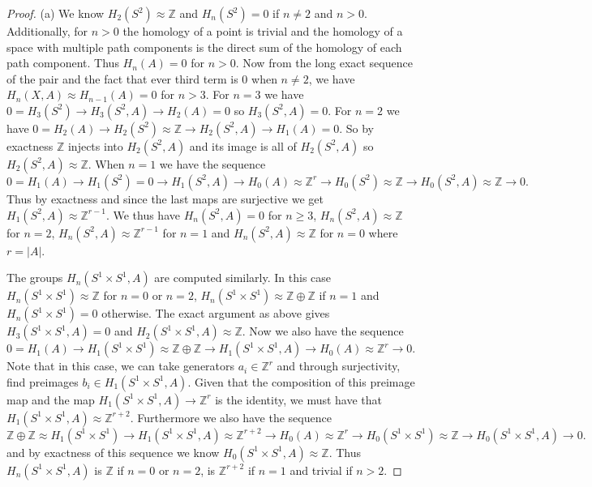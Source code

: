 \documentclass{article}
\begin{document}
\begin{proof}
(a) We know $H_2(S^2) \approx \mathbb{Z}$ and $H_n(S^2) = 0$ if $n \neq 2$ and $n > 0$. Additionally, for $n > 0$ the homology of a point is trivial and the homology of a space with multiple path components is the direct sum of the homology of each path component. Thus $H_n(A) = 0$ for $n > 0$. Now from the long exact sequence of the pair and the fact that ever third term is $0$ when $n \neq 2$, we have $H_n(X,A) \approx H_{n-1}(A) = 0$ for $n > 3$. For $n = 3$ we have $0 = H_3(S^2) \to H_3(S^2,A) \to H_2(A) = 0$ so $H_3(S^2,A) = 0$. For $n = 2$ we have $0 = H_2(A) \to H_2(S^2) \approx \mathbb{Z} \to H_2(S^2,A) \to H_1(A) = 0$. So by exactness $\mathbb{Z}$ injects into $H_2(S^2,A)$ and its image is all of $H_2(S^2,A)$ so $H_2(S^2,A) \approx \mathbb{Z}$. When $n = 1$ we have the sequence
\[
0 = H_1(A) \to H_1(S^2) = 0 \to H_1(S^2, A) \to H_0(A) \approx \mathbb{Z}^r \to H_0(S^2) \approx \mathbb{Z} \to H_0(S^2,A) \approx \mathbb{Z} \to 0.
\]
Thus by exactness and since the last maps are surjective we get $H_1(S^2,A) \approx \mathbb{Z}^{r-1}$. We thus have $H_n(S^2,A) = 0$ for $n \geq 3$, $H_n(S^2,A) \approx \mathbb{Z}$ for $n = 2$, $H_n(S^2,A) \approx \mathbb{Z}^{r-1}$ for $n = 1$ and $H_n(S^2,A) \approx \mathbb{Z}$ for $n = 0$ where $r = |A|$.

The groups $H_n(S^1 \times S^1, A)$ are computed similarly. In this case $H_n(S^1 \times S^1) \approx \mathbb{Z}$ for $n = 0$ or $n = 2$, $H_n(S^1 \times S^1) \approx \mathbb{Z} \oplus \mathbb{Z}$ if $n = 1$ and $H_n(S^1 \times S^1) = 0$ otherwise. The exact argument as above gives $H_3(S^1 \times S^1, A) = 0$ and $H_2(S^1 \times S^1, A) \approx \mathbb{Z}$. Now we also have the sequence
\[
0 = H_1(A) \to H_1(S^1 \times S^1) \approx \mathbb{Z} \oplus \mathbb{Z} \to H_1(S^1 \times S^1, A) \to H_0(A) \approx \mathbb{Z}^r \to 0.
\]
Note that in this case, we can take generators $a_i \in \mathbb{Z}^r$ and through surjectivity, find preimages $b_i \in H_1(S^1 \times S^1, A)$. Given that the composition of this preimage map and the map $H_1(S^1 \times S^1,A) \to \mathbb{Z}^r$ is the identity, we must have that $H_1(S^1 \times S^1, A) \approx \mathbb{Z}^{r+2}$. Furthermore we also have the sequence
\[
\mathbb{Z} \oplus \mathbb{Z} \approx H_1(S^1 \times S^1) \to H_1(S^1 \times S^1, A) \approx \mathbb{Z}^{r+2} \to H_0(A) \approx \mathbb{Z}^r \to H_0(S^1 \times S^1) \approx \mathbb{Z} \to H_0(S^1 \times S^1, A) \to 0.
\]
and by exactness of this sequence we know $H_0(S^1 \times S^1, A) \approx \mathbb{Z}$. Thus $H_n(S^1 \times S^1,A)$ is $\mathbb{Z}$ if $n = 0$ or $n = 2$, is $\mathbb{Z}^{r+2}$ if $n = 1$ and trivial if $n > 2$.


\end{proof}
\end{document}
